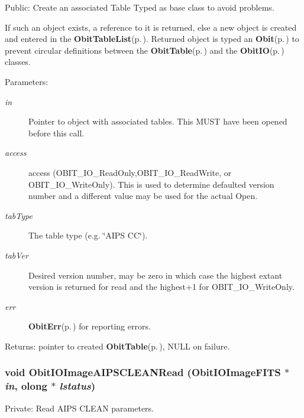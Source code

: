 Public: Create an associated Table Typed as base class to avoid problems. 

If such an object exists, a reference to it is returned, else a new object is created and entered in the {\bf Obit\-Table\-List}{\rm (p.\,\pageref{structObitTableList})}. Returned object is typed an {\bf Obit}{\rm (p.\,\pageref{structObit})} to prevent circular definitions between the {\bf Obit\-Table}{\rm (p.\,\pageref{structObitTable})} and the {\bf Obit\-IO}{\rm (p.\,\pageref{structObitIO})} classes. \begin{Desc}
\item[Parameters:]
\begin{description}
\item[{\em in}]Pointer to object with associated tables. This MUST have been opened before this call. \item[{\em access}]access (OBIT\_\-IO\_\-Read\-Only,OBIT\_\-IO\_\-Read\-Write, or OBIT\_\-IO\_\-Write\-Only). This is used to determine defaulted version number and a different value may be used for the actual Open. \item[{\em tab\-Type}]The table type (e.g. \char`\"{}AIPS CC\char`\"{}). \item[{\em tab\-Ver}]Desired version number, may be zero in which case the highest extant version is returned for read and the highest+1 for OBIT\_\-IO\_\-Write\-Only. \item[{\em err}]{\bf Obit\-Err}{\rm (p.\,\pageref{structObitErr})} for reporting errors. \end{description}
\end{Desc}
\begin{Desc}
\item[Returns:]pointer to created {\bf Obit\-Table}{\rm (p.\,\pageref{structObitTable})}, NULL on failure. \end{Desc}
\subsubsection{\setlength{\rightskip}{0pt plus 5cm}void Obit\-IOImage\-AIPSCLEANRead ({\bf Obit\-IOImage\-FITS} $\ast$ {\em in}, {\bf olong} $\ast$ {\em lstatus})}\label{ObitIOImageFITS_8c_a5}


Private: Read AIPS CLEAN parameters. 

